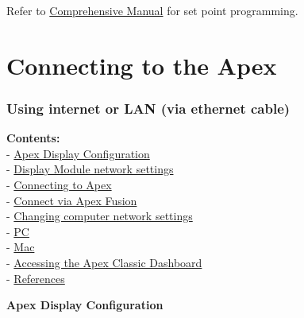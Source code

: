 \documentclass[
]{book}
\begin{document}
Refer to \href{https://github.com/SilbigerLab/Mesocosm_User_Manual/tree/7503b88686aef920c4a4ed473b1efe37b34dae10/Manuals/Apex_Comprehensive_Reference_Manual.pdf}{Comprehensive Manual} for set point programming.

\hypertarget{connecting-to-the-apex}{%
\chapter{Connecting to the Apex}\label{connecting-to-the-apex}}

\hypertarget{using-internet-or-lan-via-ethernet-cable}{%
\subsection{Using internet or LAN (via ethernet cable)}\label{using-internet-or-lan-via-ethernet-cable}}

\textbf{Contents:}\\
- \protect\hyperlink{apex_display_configuration}{Apex Display Configuration}\\
- \protect\hyperlink{display_module_network_settings}{Display Module network settings}\\
- \protect\hyperlink{connect_apex}{Connecting to Apex}\\
- \protect\hyperlink{apex_fusion_link}{Connect via Apex Fusion}\\
- \protect\hyperlink{network_settings}{Changing computer network settings}\\
- \protect\hyperlink{pc}{PC}\\
- \protect\hyperlink{mac}{Mac}\\
- \protect\hyperlink{apex_classic_dashboard}{Accessing the Apex Classic Dashboard}\\
- \protect\hyperlink{references}{References}

\textbf{Apex Display Configuration}
\end{document}
